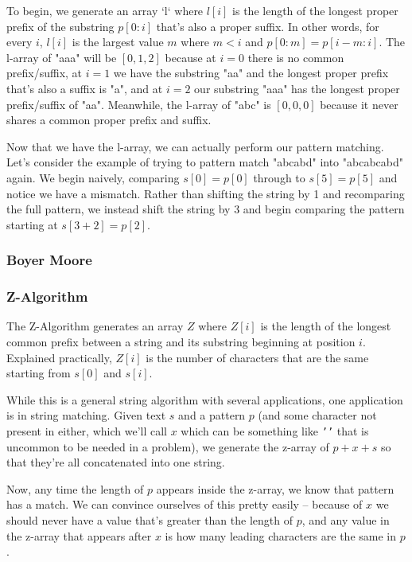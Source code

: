 To begin, we generate an array `l` where $l[i]$ is the length of the longest proper prefix of the substring $p[0:i]$ that's also a proper suffix. In other words, for every $i$, $l[i]$ is the largest value $m$ where $m < i$ and $p[0:m] = p[i-m:i]$. The l-array of "aaa" will be $[0,1,2]$ because at $i=0$ there is no common prefix/suffix, at $i=1$ we have the substring "aa" and the longest proper prefix that's also a suffix is "a", and at $i=2$ our substring "aaa" has the longest proper prefix/suffix of "aa". Meanwhile, the l-array of "abc" is $[0,0,0]$ because it never shares a common proper prefix and suffix.

Now that we have the l-array, we can actually perform our pattern matching. Let's consider the example of trying to pattern match "abcabd" into "abcabcabd" again. We begin naively, comparing $s[0] = p[0]$ through to $s[5] = p[5]$ and notice we have a mismatch. Rather than shifting the string by 1 and recomparing the full pattern, we instead shift the string by 3 and begin comparing the pattern starting at $s[3+2] = p[2]$.

\subsubsection{Boyer Moore}
\subsubsection{Z-Algorithm}

The Z-Algorithm generates an array $Z$ where $Z[i]$ is the length of the longest common prefix between a string and its substring beginning at position $i$. Explained practically, $Z[i]$ is the number of characters that are the same starting from $s[0]$ and $s[i]$.

While this is a general string algorithm with several applications, one application is in string matching. Given text $s$ and a pattern $p$ (and some character not present in either, which we'll call $x$ which can be something like \texttt{'\n'} that is uncommon to be needed in a problem), we generate the z-array of $p+x+s$ so that they're all concatenated into one string.

Now, any time the length of $p$ appears inside the z-array, we know that pattern has a match. We can convince ourselves of this pretty easily -- because of $x$ we should never have a value that's greater than the length of $p$, and any value in the z-array that appears after $x$ is how many leading characters are the same in $p$.

